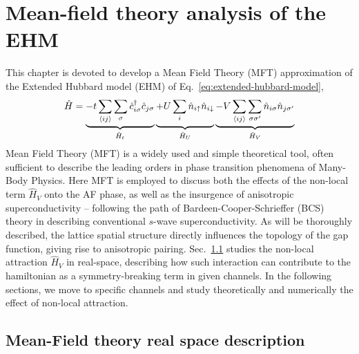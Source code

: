 \chapter{Mean-field theory analysis of the EHM}\label{chap:mft-analysis}

This chapter is devoted to develop a Mean Field Theory (MFT) approximation of the Extended Hubbard model (EHM) of Eq.~\eqref{eq:extended-hubbard-model},
\[
	\hat H =
	\underbrace{
		-t \sum_{\langle ij \rangle} \sum_\sigma \hat c_{i\sigma}^\dagger \hat c_{j\sigma}
	}_{\hat H_t} \underbrace{
		+U \sum_i \hat n_{i\uparrow} \hat n_{i\downarrow}
		\vphantom{
			\sum_{\langle ij \rangle}
		}
	}_{\hat H_U}
	\underbrace{
		- V \sum_{\langle ij \rangle} \sum_{\sigma \sigma'} \hat n_{i\sigma} \hat n_{j\sigma'}
	}_{\hat H_V}
\]
Mean Field Theory (MFT) is a widely used and simple theoretical tool, often sufficient to describe the leading orders in phase transition phenomena of Many-Body Physics. Here MFT is employed to discuss both the effects of the non-local term $\hat H_V$ onto the AF phase, as well as the insurgence of anisotropic superconductivity -- following the path of Bardeen-Cooper-Schrieffer (BCS) theory in describing conventional $s$-wave superconductivity. As will be thoroughly described, the lattice spatial structure directly influences the topology of the gap function, giving rise to anisotropic pairing. Sec.~\ref{sec:mft-analysis-non-local-source} studies the non-local attraction $\hat H_V$ in real-space, describing how such interaction can contribute to the hamiltonian as a symmetry-breaking term in given channels. In the following sections, we move to specific channels and study theoretically and numerically the effect of non-local attraction.

\section{Mean-Field theory real space description}\label{sec:mft-analysis-non-local-source}

